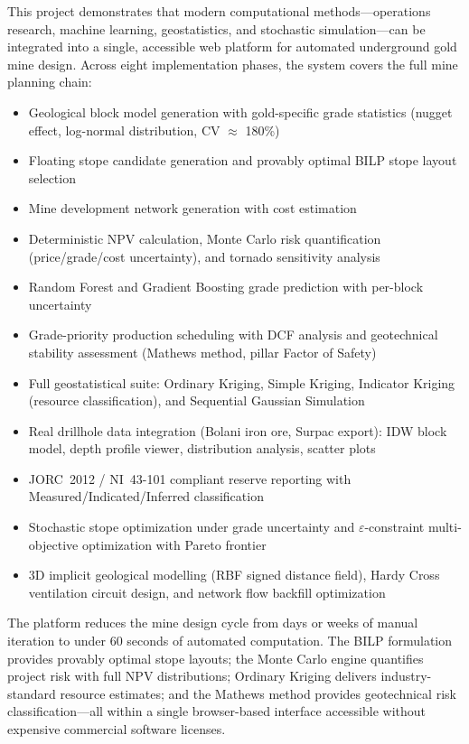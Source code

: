 \documentclass[12pt,a4paper]{article}
\begin{document}
This project demonstrates that modern computational methods---operations research, machine learning, geostatistics, and stochastic simulation---can be integrated into a single, accessible web platform for automated underground gold mine design. Across eight implementation phases, the system covers the full mine planning chain:

\begin{itemize}[itemsep=0.2em]
  \item Geological block model generation with gold-specific grade statistics (nugget effect, log-normal distribution, CV $\approx$ 180\%)
  \item Floating stope candidate generation and provably optimal BILP stope layout selection
  \item Mine development network generation with cost estimation
  \item Deterministic NPV calculation, Monte Carlo risk quantification (price/grade/cost uncertainty), and tornado sensitivity analysis
  \item Random Forest and Gradient Boosting grade prediction with per-block uncertainty
  \item Grade-priority production scheduling with DCF analysis and geotechnical stability assessment (Mathews method, pillar Factor of Safety)
  \item Full geostatistical suite: Ordinary Kriging, Simple Kriging, Indicator Kriging (resource classification), and Sequential Gaussian Simulation
  \item Real drillhole data integration (Bolani iron ore, Surpac export): IDW block model, depth profile viewer, distribution analysis, scatter plots
  \item JORC~2012 / NI~43-101 compliant reserve reporting with Measured/Indicated/Inferred classification
  \item Stochastic stope optimization under grade uncertainty and $\varepsilon$-constraint multi-objective optimization with Pareto frontier
  \item 3D implicit geological modelling (RBF signed distance field), Hardy Cross ventilation circuit design, and network flow backfill optimization
\end{itemize}

The platform reduces the mine design cycle from days or weeks of manual iteration to under 60 seconds of automated computation. The BILP formulation provides provably optimal stope layouts; the Monte Carlo engine quantifies project risk with full NPV distributions; Ordinary Kriging delivers industry-standard resource estimates; and the Mathews method provides geotechnical risk classification---all within a single browser-based interface accessible without expensive commercial software licenses.
\end{document}
